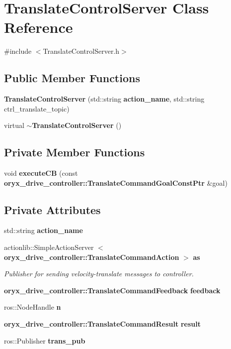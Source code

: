 \section{\-Translate\-Control\-Server \-Class \-Reference}
\label{classTranslateControlServer}


{\ttfamily \#include $<$\-Translate\-Control\-Server.\-h$>$}

\subsection*{\-Public \-Member \-Functions}
\begin{DoxyCompactItemize}
\item 
{\bf \-Translate\-Control\-Server} (std\-::string {\bf action\-\_\-name}, std\-::string ctrl\-\_\-translate\-\_\-topic)
\item 
virtual {\bf $\sim$\-Translate\-Control\-Server} ()
\end{DoxyCompactItemize}
\subsection*{\-Private \-Member \-Functions}
\begin{DoxyCompactItemize}
\item 
void {\bf execute\-C\-B} (const {\bf oryx\-\_\-drive\-\_\-controller\-::\-Translate\-Command\-Goal\-Const\-Ptr} \&goal)
\end{DoxyCompactItemize}
\subsection*{\-Private \-Attributes}
\begin{DoxyCompactItemize}
\item 
std\-::string {\bf action\-\_\-name}
\item 
actionlib\-::\-Simple\-Action\-Server\*
$<$ {\bf oryx\-\_\-drive\-\_\-controller\-::\-Translate\-Command\-Action} $>$ {\bf as}
\begin{DoxyCompactList}\small\item\em \-Publisher for sending velocity-\/translate messages to controller. \end{DoxyCompactList}\item 
{\bf oryx\-\_\-drive\-\_\-controller\-::\-Translate\-Command\-Feedback} {\bf feedback}
\item 
ros\-::\-Node\-Handle {\bf n}
\item 
{\bf oryx\-\_\-drive\-\_\-controller\-::\-Translate\-Command\-Result} {\bf result}
\item 
ros\-::\-Publisher {\bf trans\-\_\-pub}
\end{DoxyCompactItemize}


